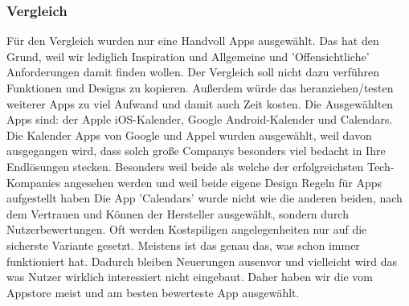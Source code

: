 \subsubsection{Vergleich}
Für den Vergleich wurden nur eine Handvoll Apps ausgewählt. Das hat den Grund, weil wir lediglich Inspiration und Allgemeine und 'Offensichtliche' Anforderungen damit finden wollen. Der Vergleich soll nicht dazu verführen Funktionen und Designs zu kopieren. Außerdem würde das heranziehen/testen weiterer Apps zu viel Aufwand und damit auch Zeit kosten. \newline
Die Ausgewählten Apps sind: der Apple iOS-Kalender, Google Android-Kalender und Calendars.
Die Kalender Apps von Google und Appel wurden ausgewählt, weil davon ausgegangen wird, dass solch große Companys besonders viel bedacht in Ihre Endlösungen stecken. Besonders weil beide als welche der erfolgreichsten Tech-Kompanies angesehen werden \cite{techCompanies} und weil beide eigene Design Regeln für Apps aufgestellt haben \myTodo \newline
Die App 'Calendars' wurde nicht wie die anderen beiden, nach dem Vertrauen und Können der Hersteller ausgewählt, sondern durch Nutzerbewertungen. Oft werden Kostspiligen angelegenheiten nur auf die sicherste Variante gesetzt. Meistens ist das genau das, was schon immer funktioniert hat. Dadurch bleiben Neuerungen ausenvor und vielleicht wird das was Nutzer wirklich interessiert nicht eingebaut. Daher haben wir die vom Appstore meist und am besten bewerteste App ausgewählt.
 